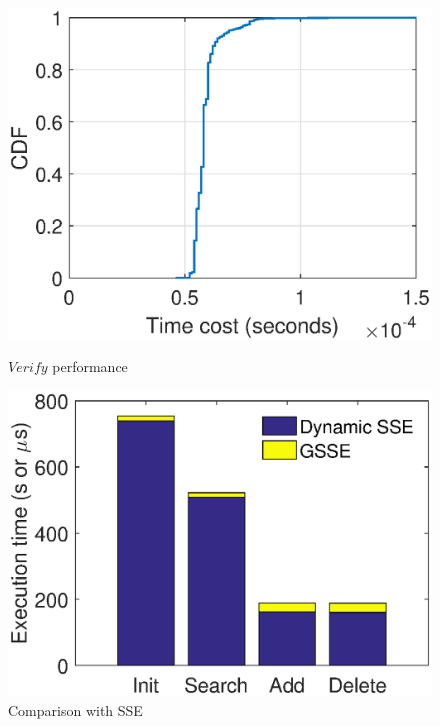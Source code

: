 \begin{figure}[bhpt]
  \hspace{-40.0pt}
  \par \vspace{-10.pt}
  \hspace{-36.0pt}

  \begin{minipage}[b]{0.48 \textwidth}
    \includegraphics[width=\textwidth]{expr/verify}
    \caption{$Verify$ performance}
    \label{fig:verify}
  \end{minipage}
  \begin{minipage}[b]{0.48 \textwidth}
    \includegraphics[width=\textwidth]{expr/comparison}
    \caption{Comparison with SSE~\cite{cash2014dynamic}}
    \label{fig:comparison}
  \end{minipage}
\centering
\end{figure}

